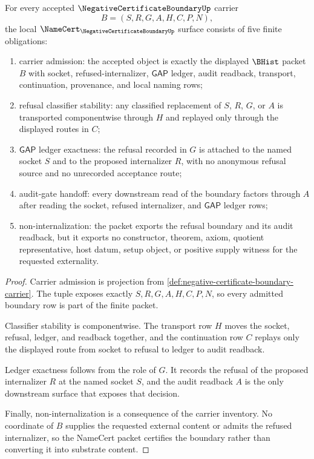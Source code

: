 \begin{theorem}
\label{thm:negative-certificate-boundary-namecert-obligations}
For every accepted $\NegativeCertificateBoundaryUp$ carrier
$$
B=(S,R,G,A,H,C,P,N),
$$
the local $\NameCert_{\NegativeCertificateBoundaryUp}$ surface consists of five finite obligations:
\begin{enumerate}
\item carrier admission: the accepted object is exactly the displayed $\BHist$ packet $B$ with socket, refused-internalizer, $\mathsf{GAP}$ ledger, audit readback, transport, continuation, provenance, and local naming rows;
\item refusal classifier stability: any classified replacement of $S$, $R$, $G$, or $A$ is transported componentwise through $H$ and replayed only through the displayed routes in $C$;
\item $\mathsf{GAP}$ ledger exactness: the refusal recorded in $G$ is attached to the named socket $S$ and to the proposed internalizer $R$, with no anonymous refusal source and no unrecorded acceptance route;
\item audit-gate handoff: every downstream read of the boundary factors through $A$ after reading the socket, refused internalizer, and $\mathsf{GAP}$ ledger rows;
\item non-internalization: the packet exports the refusal boundary and its audit readback, but it exports no constructor, theorem, axiom, quotient representative, host datum, setup object, or positive supply witness for the requested externality.
\end{enumerate}
\end{theorem}
\begin{proof}
Carrier admission is projection from \autoref{def:negative-certificate-boundary-carrier}. The tuple exposes exactly $S,R,G,A,H,C,P,N$, so every admitted boundary row is part of the finite packet.

Classifier stability is componentwise. The transport row $H$ moves the socket, refusal, ledger, and readback together, and the continuation row $C$ replays only the displayed route from socket to refusal to ledger to audit readback.

Ledger exactness follows from the role of $G$. It records the refusal of the proposed internalizer $R$ at the named socket $S$, and the audit readback $A$ is the only downstream surface that exposes that decision.

Finally, non-internalization is a consequence of the carrier inventory. No coordinate of $B$ supplies the requested external content or admits the refused internalizer, so the NameCert packet certifies the boundary rather than converting it into substrate content.
\end{proof}

